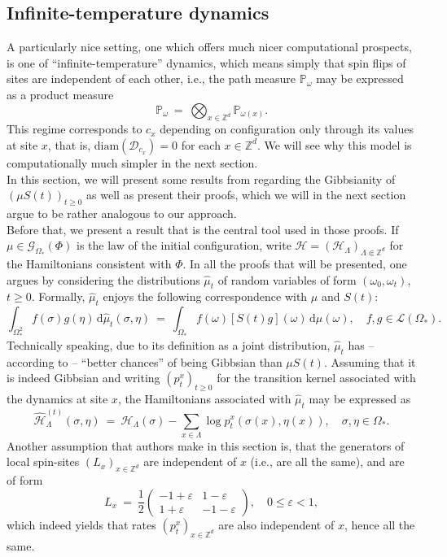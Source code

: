 \documentclass[12pt]{article}
\newcommand{\D}{\mathcal{D}}
\renewcommand{\d}{\mathrm{d}}
\newcommand{\G}{\mathcal{G}}
\renewcommand{\H}{\mathcal{H}}
\newcommand{\Loc}{\mathcal{L}}
\renewcommand{\P}{\mathbb{P}}
\newcommand{\Z}{\mathbb{Z}}
\newcommand{\1}{\mathbbm{1}}
\newcommand{\5}{\vspace{0.5cm}}
\renewcommand{\hat}{\widehat}
\theoremstyle{definition}
\begin{document}
\subsection{Infinite-temperature dynamics}

A particularly nice setting, one which offers much nicer computational prospects, is one of ``infinite-temperature'' dynamics, which means simply that spin flips of sites are independent of each other, i.e., the path measure $\P_\omega$ may be expressed as a product measure
$$\P_\omega ~=~ \bigotimes_{x\in\Z^d}\P_{\omega(x)}.$$
This regime corresponds to $c_x$ depending on configuration only through its values at site $x$, that is, $\mathrm{diam}(\D_{c_x})=0$ for each $x\in\Z^d$. We will see why this model is computationally much simpler in the next section. \\

In this section, we will present some results from \cite{EFHR} regarding the Gibbsianity of $(\mu S(t))_{t\geq 0}$ as well as present their proofs, which we will in the next section argue to be rather analogous to our approach. \\

Before that, we present a result that is the central tool used in those proofs. If $\mu\in\G_{\Omega_*}(\Phi)$ is the law of the initial configuration, write $\H=(\H_\Lambda)_{\Lambda\Subset\Z^d}$ for the Hamiltonians consistent with $\Phi$. In all the proofs that will be presented, one argues by considering the distributions $\hat{\mu}_t$ of random variables of form $(\omega_0,\omega_t)$, $t\geq 0$. Formally, $\hat{\mu}_t$ enjoys the following correspondence with $\mu$ and $S(t)$:
$$\int_{\Omega_*^2} f(\sigma)g(\eta)\,\d\hat{\mu}_t(\sigma,\eta) ~=~ \int_{\Omega_*}f(\omega)[S(t)g](\omega)\,\d\mu(\omega), \quad f,g\in\Loc(\Omega_*).$$
Technically speaking, due to its definition as a joint distribution, $\hat{\mu}_t$ has -- according to \cite{EFHR} -- ``better chances'' of being Gibbsian than $\mu S(t)$. Assuming that it is indeed Gibbsian and writing $(p_t^x)_{t\geq 0}$ for the transition kernel associated with the dynamics at site $x$, the Hamiltonians associated with $\hat{\mu}_t$ may be expressed as
$$\hat{\H}_\Lambda^{(t)}(\sigma,\eta) ~=~ \H_\Lambda(\sigma) - \sum_{x\in\Lambda}\log p_t^x(\sigma(x),\eta(x)), \quad \sigma,\eta\in\Omega_*.$$
Another assumption that authors make in this section is, that the generators of local spin-sites $(L_x)_{x\in\Z^d}$ are independent of $x$ (i.e., are all the same), and are of form
$$L_x ~=~ \frac{1}{2}\begin{pmatrix}
-1+\varepsilon & 1-\varepsilon \\
1+\varepsilon & -1-\varepsilon
\end{pmatrix}, \quad 0\leq \varepsilon<1,$$
which indeed yields that rates $(p_t^x)_{x\in\Z^d}$ are also independent of $x$, hence all the same.\\
\end{document}

